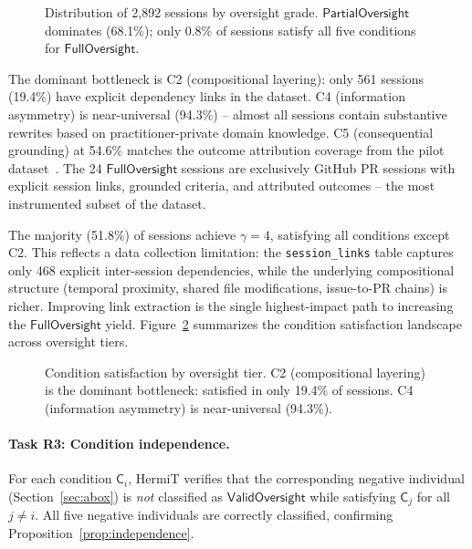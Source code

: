 \documentclass[11pt]{article}
\begin{document}
\begin{figure}[t]
\centering

\caption{Distribution of 2{,}892 sessions by oversight grade. $\mathsf{PartialOversight}$ dominates (68.1\%); only 0.8\% of sessions satisfy all five conditions for $\mathsf{FullOversight}$.}
\label{fig:oversight-dist}
\end{figure}

The dominant bottleneck is C2 (compositional layering): only 561 sessions (19.4\%) have explicit dependency links in the dataset.
C4 (information asymmetry) is near-universal (94.3\%) -- almost all sessions contain substantive rewrites based on practitioner-private domain knowledge.
C5 (consequential grounding) at 54.6\% matches the outcome attribution coverage from the pilot dataset~\citep{ovcharov2025citation,ovcharov2025statute}.
The 24 $\mathsf{FullOversight}$ sessions are exclusively GitHub PR sessions with explicit session links, grounded criteria, and attributed outcomes -- the most instrumented subset of the dataset.

The majority (51.8\%) of sessions achieve $\gamma = 4$, satisfying all conditions except C2.
This reflects a data collection limitation: the \texttt{session\_links} table captures only 468 explicit inter-session dependencies, while the underlying compositional structure (temporal proximity, shared file modifications, issue-to-PR chains) is richer.
Improving link extraction is the single highest-impact path to increasing the $\mathsf{FullOversight}$ yield.
Figure~\ref{fig:condition-heatmap} summarizes the condition satisfaction landscape across oversight tiers.

\begin{figure}[t]
\centering

\caption{Condition satisfaction by oversight tier. C2 (compositional layering) is the dominant bottleneck: satisfied in only 19.4\% of sessions. C4 (information asymmetry) is near-universal (94.3\%).}
\label{fig:condition-heatmap}
\end{figure}

\paragraph{Task R3: Condition independence.}
For each condition $\mathsf{C}_i$, HermiT verifies that the corresponding negative individual (Section~\ref{sec:abox}) is \emph{not} classified as $\mathsf{ValidOversight}$ while satisfying $\mathsf{C}_j$ for all $j \neq i$.
All five negative individuals are correctly classified, confirming Proposition~\ref{prop:independence}.
\end{document}
